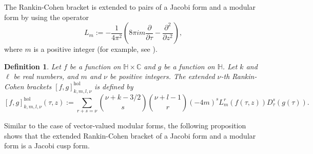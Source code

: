 \documentclass[11pt]{amsart}
\newtheorem{dfn}[thm]{Definition}
\theoremstyle{definition}
\theoremstyle{remark}
\numberwithin{equation}{section}
\renewcommand{\(}{\left(}
\renewcommand{\)}{\right)}
\begin{document}
The Rankin-Cohen bracket is extended to pairs of a Jacobi form and a modular form by using the operator
\[ L_m := -\frac{1}{4\pi^2}\left(8\pi i m \frac{\partial}{\partial \tau} - \frac{\partial^2}{\partial z^2} \right),\]
where $m$ is a positive integer (for example, see \cite{K}).

\begin{dfn}\cite[Definition 1.1]{K}\label{def 3}
    Let $f$ be a function on $\mathbb{H}\times \mathbb{C}$ and $g$ be a function on $\mathbb{H}$. 
    Let $k$ and $\ell$ be real numbers, and $m$ and $\nu$ be positive integers. 
    The extended $\nu$-th Rankin-Cohen brackets $[f,g]^{\mathrm{hol}}_{k,m,l,\nu}$ is defined by 
    \[[f,g]^{\mathrm{hol}}_{k,m,l,\nu}(\tau,z):=\sum_{r+s=\nu}\binom{\nu+k-3/2}{s}\binom{\nu+l-1}{r}(-4m)^s L_m^{r}(f(\tau,z))D^s_{\tau}(g(\tau)). \]
\end{dfn}

Similar to the case of vector-valued modular forms, the following proposition shows that the extended Rankin-Cohen bracket of a Jacobi form and a modular form is a Jacobi cusp form.
\end{document}
